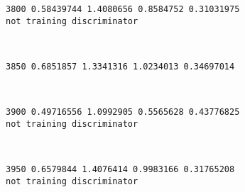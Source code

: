 \documentclass[11pt]{article}
\begin{document}
    \begin{Verbatim}[commandchars=\\\{\}]
3800 0.58439744 1.4080656 0.8584752 0.31031975
not training discriminator

    \end{Verbatim}

    \begin{center}
    \end{center}
    { \hspace*{\fill} \\}
    
    \begin{Verbatim}[commandchars=\\\{\}]
3850 0.6851857 1.3341316 1.0234013 0.34697014

    \end{Verbatim}

    \begin{center}
    \end{center}
    { \hspace*{\fill} \\}
    
    \begin{Verbatim}[commandchars=\\\{\}]
3900 0.49716556 1.0992905 0.5565628 0.43776825
not training discriminator

    \end{Verbatim}

    \begin{center}
    \end{center}
    { \hspace*{\fill} \\}
    
    \begin{Verbatim}[commandchars=\\\{\}]
3950 0.6579844 1.4076414 0.9983166 0.31765208
not training discriminator

    \end{Verbatim}

    \begin{center}
    \end{center}
    { \hspace*{\fill} \\}
    
\end{document}
